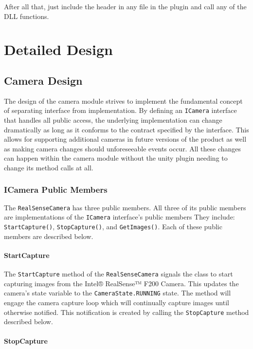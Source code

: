 \documentclass[12pt]{article}
\begin{document}
After all that, just include the header in any file in the plugin and
call any of the DLL functions.

\section{Detailed Design}\label{detailed-design}

\subsection{Camera Design}\label{camera-design}

The design of the camera module strives to implement the fundamental
concept of separating interface from implementation. By defining an
\texttt{ICamera} interface that handles all public access, the
underlying implementation can change dramatically as long as it conforms
to the contract specified by the interface. This allows for supporting
additional cameras in future versions of the product as well as making
camera changes should unforeseeable events occur. All these changes can
happen within the camera module without the unity plugin needing to
change its method calls at all.

\subsubsection{ICamera Public Members}\label{icamera-public-members}

The \texttt{RealSenseCamera} has three public members. All three of its
public members are implementations of the \texttt{ICamera} interface's
public members They include: \texttt{StartCapture()},
\texttt{StopCapture()}, and \texttt{GetImages()}. Each of these public
members are described below.

\paragraph{StartCapture}\label{startcapture}

The \texttt{StartCapture} method of the \texttt{RealSenseCamera} signals
the class to start capturing images from the Intel® RealSense™ F200
Camera. This updates the camera's state variable to the
\texttt{CameraState.RUNNING} state. The method will engage the camera
capture loop which will continually capture images until otherwise
notified. This notification is created by calling the
\texttt{StopCapture} method described below.

\paragraph{StopCapture}\label{stopcapture}
\end{document}
